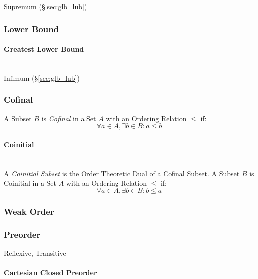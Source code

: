 Supremum (\S\ref{sec:glb_lub})



\subsubsection{Lower Bound}\label{sec:lower_bound}

\paragraph{Greatest Lower Bound}\label{sec:greatest_lowerbound}
\hfill \\

Infimum (\S\ref{sec:glb_lub})



\subsubsection{Cofinal}\label{sec:cofinal}

A Subset $B$ is \emph{Cofinal} in a Set $A$ with an Ordering Relation
$\leq$ if:
\[
  \forall a \in A, \exists b \in B : a \leq b
\]



\paragraph{Coinitial}\label{sec:coinitial}
\hfill \\

A \emph{Coinitial Subset} is the Order Theoretic Dual of a Cofinal
Subset. A Subset $B$ is Coinitial in a Set $A$ with an Ordering
Relation $\leq$ if:
\[
  \forall a \in A, \exists b \in B : b \leq a
\]



\subsubsection{Weak Order}\label{sec:weak_order}

\subsubsection{Preorder}\label{sec:preorder}

Reflexive, Transitive


\paragraph{Cartesian Closed Preorder}\label{sec:cartesian_preorder}
\hfill \\

